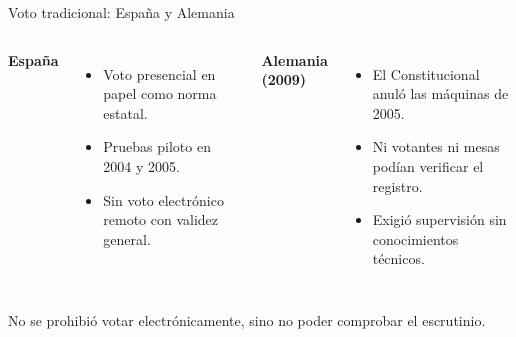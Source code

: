 \documentclass[aspectratio=169,12pt]{beamer}
\begin{document}
\begin{frame}{Voto tradicional: España y Alemania}
  \begin{columns}[T]
      {\color{azul}\large\bfseries España}\\[0.15cm]
      \begin{itemize}
        \item Voto presencial en papel como norma estatal.
        \item Pruebas piloto en 2004 y 2005.
        \item Sin voto electrónico remoto con validez general.
      \end{itemize}
      {\color{terra}\large\bfseries Alemania (2009)}\\[0.15cm]
      \begin{itemize}
        \item El Constitucional anuló las máquinas de 2005.
        \item Ni votantes ni mesas podían verificar el registro.
        \item Exigió supervisión sin conocimientos técnicos.
      \end{itemize}
  \end{columns}
  \vspace{0.3cm}
  {\large\alert{No se prohibió votar electrónicamente, sino no poder comprobar el escrutinio.}}
\end{frame}
\end{document}
